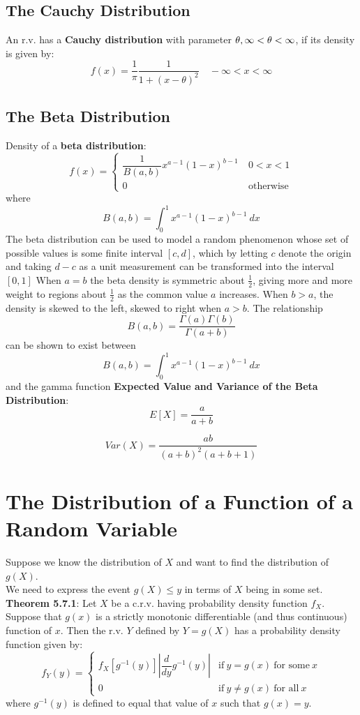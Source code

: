 \documentclass[openany]{book}
\numberwithin{equation}{section}
\begin{document}
\begin{flushleft}
\subsection{The Cauchy Distribution}
An r.v. has a \textbf{Cauchy distribution} with parameter $\theta , \-\infty<\theta<\infty$, if its density is given by:
\[f(x)=\frac{1}{\pi}\frac{1}{1+(x-\theta)^2} \quad -\infty<x<\infty
\]
\subsection{The Beta Distribution}
Density of a \textbf{beta distribution}:
\[f(x)=
\begin{cases}
\dfrac{1}{B(a,b)}x^{a-1}(1-x)^{b-1} \ & 0<x<1\\
0 & \text{otherwise}
\end{cases}
\]
where
\[B(a,b)=\int_{0}^{1}x^{a-1}(1-x)^{b-1} \ dx
\]
The beta distribution can be used to model a random phenomenon whose set of possible values is some finite interval $[c,d]$, which by letting $c$ denote the origin and taking $d-c$ as a unit measurement can be transformed into the interval $[0,1]$ \medbreak
When $a=b$ the beta density is symmetric about $\frac{1}{2}$, giving more and more weight to regions about $\frac{1}{2}$ as the common value $a$ increases. \medbreak
When $b>a$, the density is skewed to the left, skewed to right when $a>b$.\medbreak
The relationship
\begin{equation}
\label{5.6.3}
B(a,b)=\dfrac{\Gamma(a)\Gamma(b)}{\Gamma(a+b)}
\end{equation}
can be shown to exist between
\[B(a,b)=\int_{0}^{1}x^{a-1}(1-x)^{b-1} \ dx
\]
and the gamma function\medbreak
\textbf{Expected Value and Variance of the Beta Distribution}:
\[E[X]=\frac{a}{a+b}
\]

\[Var(X)= \frac{ab}{(a+b)^2(a+b+1)}
\]
\section{The Distribution of a Function of a Random Variable}
Suppose we know the distribution of $X$ and want to find the distribution of $g(X)$.\\
We need to express the event $g(X)\leq y$ in terms of $X$ being in some set. \medbreak
\textbf{Theorem 5.7.1}: Let $X$ be a c.r.v. having probability density function $f_X$. Suppose that $g(x)$ is a strictly monotonic differentiable (and thus continuous) function of $x$. Then the r.v. $Y$ defined by $Y=g(X)$ has a probability density function given by:
\[f_Y(y)=\begin{cases}
f_X[g^{-1}(y)] \left|\dfrac{d}{dy}g^{-1}(y) \right| & \text{if} \ y=g(x) \ \text{for some} \ x\\
0 & \text{if} \ y\neq g(x) \ \text{for all} \ x
\end{cases}
\]
where $g^{-1}(y)$ is defined to equal that value of $x$ such that $g(x)=y$.

\end{flushleft}
\end{document}
